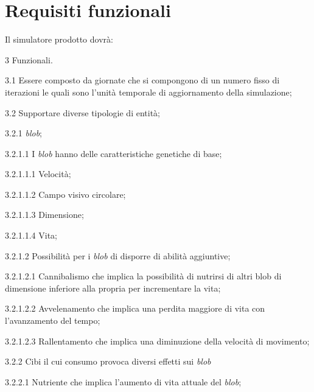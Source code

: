 \section{Requisiti funzionali}
Il simulatore prodotto dovrà:

\begin{myEnumerate}
    \item[3] Funzionali.
    \begin{myEnumerate}[label*=\arabic*.]
	\item[3.1] Essere composto da giornate che si compongono di un numero fisso di iterazioni le quali sono l'unità temporale di aggiornamento della simulazione;
        \item[3.2] Supportare diverse tipologie di entità;
	\begin{myEnumerate}[label*=\arabic*.]
        	\item[3.2.1] \textit{blob};
		\begin{myEnumerate}[label*=\arabic*.]
        		\item[3.2.1.1] I \textit{blob} hanno delle caratteristiche genetiche di base;
			\begin{myEnumerate}[label*=\arabic*.]
        			\item[3.2.1.1.1] Velocità;
				\item[3.2.1.1.2] Campo visivo circolare;
				\item[3.2.1.1.3] Dimensione;
				\item[3.2.1.1.4] Vita;
    			\end{myEnumerate}
			\item[3.2.1.2] Possibilità per i \textit{blob} di disporre di abilità aggiuntive;
			\begin{myEnumerate}[label*=\arabic*.]
        			\item[3.2.1.2.1] Cannibalismo che implica la possibilità di nutrirsi di altri blob di dimensione inferiore alla propria per incrementare la vita;
				\item[3.2.1.2.2] Avvelenamento che implica una perdita maggiore di vita con l'avanzamento del tempo;
				\item[3.2.1.2.3] Rallentamento che implica una diminuzione della velocità di movimento;
    			\end{myEnumerate}
    		\end{myEnumerate}
		\item[3.2.2] Cibi il cui consumo provoca diversi effetti sui \textit{blob}
		\begin{myEnumerate}[label*=\arabic*.]
        		\item[3.2.2.1] Nutriente che implica l'aumento di vita attuale del \textit{blob};

\end{myEnumerate}
\end{myEnumerate}
\end{myEnumerate}
\end{myEnumerate}
